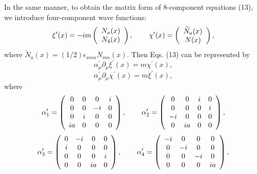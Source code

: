 \documentclass[a4paper,12pt]{article}
\begin{document}
In the same manner, to obtain the matrix form of 8-component
equations (13), we introduce four-component wave functions:
\begin{equation}
\xi ^{\prime }(x)=-im\left(
\begin{array}{c}
N_a(x) \\
N_4(x)
\end{array}
\right) ,\hspace{0.3in}\chi ^{\prime }(x)=\left(
\begin{array}{c}
\widetilde{N}_a(x) \\
N(x)
\end{array}
\right) , \label{32}
\end{equation}
where $\widetilde{N} _a(x)=(1/2)\epsilon _{amn}N_{mn}(x)$. Then
Eqs. (13) can be represented by
\[
\alpha _\mu ^{\prime }\partial _\mu \xi ^{\prime }(x)=m\chi
^{\prime }(x),
\]
\vspace{-7mm}
\begin{equation}
\label{33}
\end{equation}
\vspace{-7mm}
\[
\overline{\alpha }_\mu ^{\prime }\partial _\mu \chi ^{\prime
}(x)=m\xi ^{\prime }(x),
\]
where
\[
\alpha _1^{\prime }=\left(
\begin{array}{cccc}
0 & 0 & 0 & i \\
0 & 0 & -i & 0 \\
0 & i & 0 & 0 \\
ia & 0 & 0 & 0
\end{array}
\right) ,\hspace{0.3in}
 \alpha _2^{\prime }=\left(
\begin{array}{cccc}
0 & 0 & i & 0 \\
0 & 0 & 0 & i \\
-i & 0 & 0 & 0 \\
0 & ia & 0 & 0
\end{array}
\right) ,
\]
\[ \alpha _3^{\prime }=\left(
\begin{array}{cccc}
0 & -i & 0 & 0 \\
i & 0 & 0 & 0 \\
0 & 0 & 0 & i \\
0 & 0 & ia & 0
\end{array}
\right) ,\hspace{0.3in}
 \alpha _4^{\prime }=\left(
\begin{array}{cccc}
-i & 0 & 0 & 0 \\
0 & -i & 0 & 0 \\
0 & 0 & -i & 0 \\
0 & 0 & 0 & ia
\end{array}
\right) ,
\]
\end{document}
